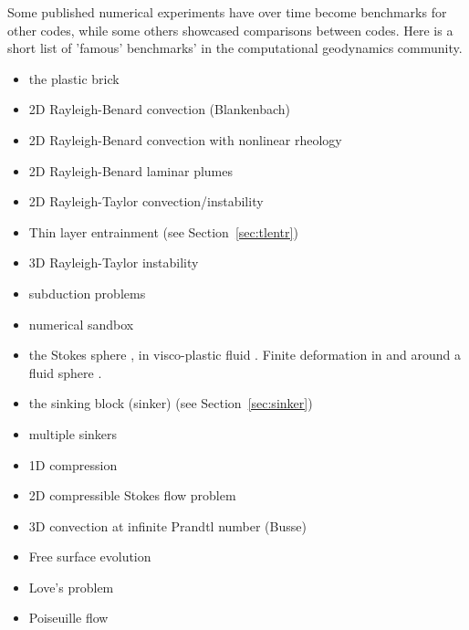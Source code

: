 Some published numerical experiments have over time become benchmarks for other codes, while some 
others showcased comparisons between codes. Here is a short list of 'famous' benchmarks' in the 
computational geodynamics community.

\begin{itemize}
\item the plastic brick \cite{lemm08,kaus10,qurj09,mishin11,muso11,maie12,spmw16,gltf18,frbt19}
\item 2D Rayleigh-Benard convection (Blankenbach)  \cite{blbc89,trha98,chhl08,king09,lezh11,vyrc13,trab90,bepo10,chgs02}
\item 2D Rayleigh-Benard convection with nonlinear rheology \cite{tosn15,aspectmanual}
\item 2D Rayleigh-Benard laminar plumes \cite{vavl09}
\item 2D Rayleigh-Taylor convection/instability \cite{pros81,trab90,wesc92,popo92,soga01,bast02,taki03,bomh06}
      \cite{basd08,qurj09,saev10,como97,lezh11,lomw12,vyrc13,vaks97,bomh06,chtl13,deka08,mishin11,maie12}
      \cite{fusc13,devv00a,dadh07,demh19,aspectmanual}
\item Thin layer entrainment (see Section~\ref{sec:tlentr})
\item 3D Rayleigh-Taylor instability \cite{fukk08,vosc15}
\item subduction problems \cite{scbe08,vack08,cehg14}
\item numerical sandbox \cite{bbeg06,maie12,busa16,gltf18}
\item the Stokes sphere \cite{galemanual,aspectmanual}, in visco-plastic fluid \cite{limd02,bemj04}. 
      Finite deformation in and around a fluid sphere \cite{sccm88,crud88}.
\item the sinking block (sinker) \cite{thie11,cehg14,gery10,geyu03,mamo08,mishin11,fumt11,maie12} (see Section~\ref{sec:sinker})
\item multiple sinkers \cite{mabl14,mabl15}
\item 1D compression \cite{modm02}
\item 2D compressible Stokes flow problem \cite{itki94,tagu07,lezh08,kilv10,lizh13}
\item 3D convection at infinite Prandtl number (Busse) \cite{bucc93,trha98,onmm06,krhb12}
\item Free surface evolution \cite{crsg12,aspectmanual}
\item Love's problem \cite{bebe04}
\item Poiseuille flow \cite{fojg94,fuku11,tagm09}

\end{itemize}

